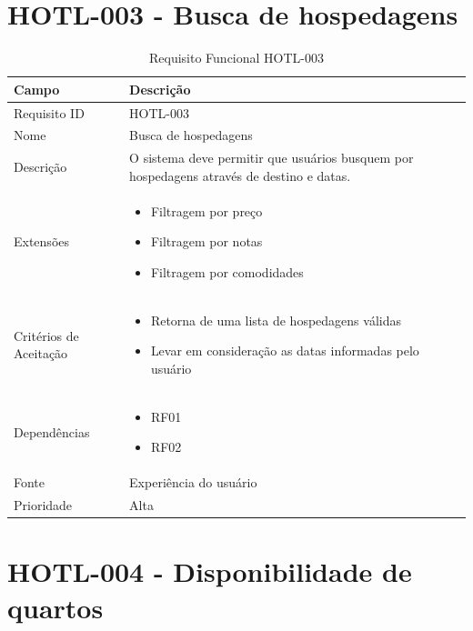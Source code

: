 \documentclass[
    12pt,
    oneside,
    a4paper,
    brazil
]{abntex2}
\begin{document}
\section{HOTL-003 - Busca de hospedagens}

\begin{table}[h]
	\begin{tabular}{|l|p{10cm}|}
		\hline
		\textbf{Campo} & \textbf{Descrição} \\
		\hline
		Requisito ID & HOTL-003 \\
		\hline
		Nome & Busca de hospedagens \\
		\hline
		Descrição & O sistema deve permitir que usuários busquem por hospedagens através de destino e datas. \\
		\hline
		Extensões & \begin{itemize}[leftmargin=*, labelsep=0.5em, noitemsep, topsep=0pt]
		\item Filtragem por preço
		\item Filtragem por notas
		\item Filtragem por comodidades
		\end{itemize} \\
		\hline
		Critérios de Aceitação & \begin{itemize}[leftmargin=*, labelsep=0.5em, noitemsep, topsep=0pt]
		\item Retorna de uma lista de hospedagens válidas
		\item Levar em consideração as datas informadas pelo usuário
		\end{itemize} \\
		\hline
		Dependências & \begin{itemize}[leftmargin=*, labelsep=0.5em, noitemsep, topsep=0pt] 
		\item RF01 
		\item RF02
		\end{itemize} \\
		\hline
		Fonte & Experiência do usuário \\
		\hline
		Prioridade & Alta \\
		\hline
	\end{tabular}
	\caption{Requisito Funcional HOTL-003}
\end{table}

\section{HOTL-004 - Disponibilidade de quartos}
\end{document}
